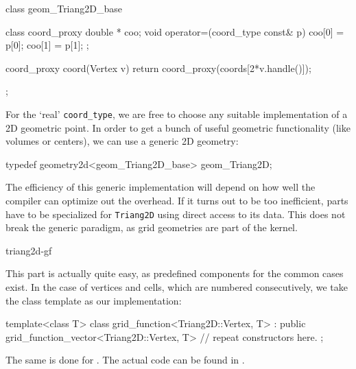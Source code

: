 \begin{example}
class geom_Triang2D_base {

   class coord_proxy {
     double * coo;
     void operator=(coord_type const& p) 
     {  coo[0] = p[0]; coo[1] = p[1]; }
   };

   coord_proxy        coord(Vertex v) 
   { return coord_proxy(coords[2*v.handle()]);}
};
\end{example}


For the `real' \texttt{coord\_type}, 
we are free to choose any suitable implementation
of a 2D geometric point.
In order to get a bunch of useful geometric functionality
(like volumes or centers), 
we can use a generic 2D geometry:

\begin{example}
 typedef geometry2d<geom_Triang2D_base>  geom_Triang2D;
\end{example}

The efficiency of this generic implementation will depend
on how well the compiler can optimize out the overhead.
If it turns out to be too inefficient, 
parts have to be specialized for \texttt{Triang2D}
using direct  access to its data. 
This does not break the generic paradigm,
as grid geometries are part of the kernel.


\begin{Label}{triang2d-gf}
\end{Label}

This part is actually quite easy, as predefined components
for the common cases exist.
In the case of vertices and cells, which are
numbered consecutively, we take the class
template 
as our implementation:

\begin{example}
template<class T>
class grid_function<Triang2D::Vertex, T>
 : public grid_function_vector<Triang2D::Vertex, T> 
{
 // repeat constructors here.
};
\end{example}
The same is done for .
The actual code can be found in 
.

